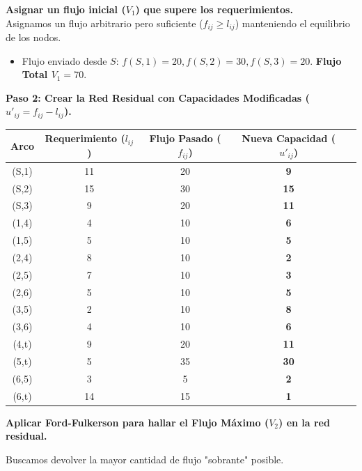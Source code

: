 \documentclass[10pt,a4paper]{article}
\begin{document}
\textbf{Asignar un flujo inicial ($V_1$) que supere los requerimientos.} \\
Asignamos un flujo arbitrario pero suficiente ($f_{ij} \ge l_{ij}$) manteniendo el equilibrio de los nodos.
\begin{itemize}
    \item Flujo enviado desde $S$: $f(S,1)=20, f(S,2)=30, f(S,3)=20$. \textbf{Flujo Total $V_1 = 70$}.
\end{itemize}

\textbf{Paso 2: Crear la Red Residual con Capacidades Modificadas ($u'_{ij} = f_{ij} - l_{ij}$).}


\begin{table}[h!]
\centering
\begin{tabular}{ccccc}
\toprule
\textbf{Arco} & \textbf{Requerimiento ($l_{ij}$)} & \textbf{Flujo Pasado ($f_{ij}$)} & \textbf{Nueva Capacidad ($u'_{ij}$)} \\
\midrule
(S,1) & 11 & 20 & \textbf{9} \\
(S,2) & 15 & 30 & \textbf{15} \\
(S,3) & 9  & 20 & \textbf{11} \\
(1,4) & 4  & 10 & \textbf{6} \\
(1,5) & 5  & 10 & \textbf{5} \\
(2,4) & 8  & 10 & \textbf{2} \\
(2,5) & 7  & 10 & \textbf{3} \\
(2,6) & 5  & 10 & \textbf{5} \\
(3,5) & 2  & 10 & \textbf{8} \\
(3,6) & 4  & 10 & \textbf{6} \\
(4,t) & 9  & 20 & \textbf{11} \\
(5,t) & 5  & 35 & \textbf{30} \\
(6,5) & 3  & 5  & \textbf{2} \\
(6,t) & 14 & 15 & \textbf{1} \\
\bottomrule
\end{tabular}
\end{table}

\textbf{Aplicar Ford-Fulkerson para hallar el Flujo Máximo ($V_2$) en la red residual.}

\newpage

Buscamos devolver la mayor cantidad de flujo "sobrante" posible.
\end{document}
